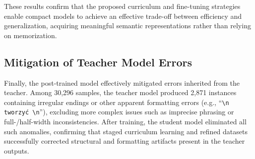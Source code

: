 \documentclass[preprint,12pt]{elsarticle}
\begin{document}
These results confirm that the proposed curriculum and fine-tuning strategies enable compact models to achieve an effective trade-off between efficiency and generalization, acquiring meaningful semantic representations rather than relying on memorization.

\begin{table}[t]
\centering
\caption{
\textbf{Generalization Performance on Unseen Datasets (\textit{CLTS} and \textit{CNewSum(v2)}).}
Models are evaluated using ROUGE-1 (R-1), ROUGE-2 (R-2), and ROUGE-L (R-L) scores.
The two highest scores in each column are shown in \textbf{bold}.
Qwen2.5-32B achieves the best performance on CLTS, while Qwen2.5-3B slightly surpasses it on CNewSum(v2), demonstrating stronger domain adaptability.
The proposed multi-stage trained student (Qwen2.5-0.5B\_5stg\_v4-lr\_adj) maintains competitive generalization despite its smaller scale.
}
\label{unseen_datasets_simple}
\renewcommand{\arraystretch}{1.0}
\end{table}

\subsection{Mitigation of Teacher Model Errors}
Finally, the post-trained model effectively mitigated errors inherited from the teacher.
Among 30,296 samples, the teacher model produced 2,871 instances containing irregular endings or other apparent formatting errors (e.g., ``\texttt{\textbackslash n tworzyć \textbackslash n}''), excluding more complex issues such as imprecise phrasing or full-/half-width inconsistencies.
After training, the student model eliminated all such anomalies, confirming that staged curriculum learning and refined datasets successfully corrected structural and formatting artifacts present in the teacher outputs.
\end{document}
